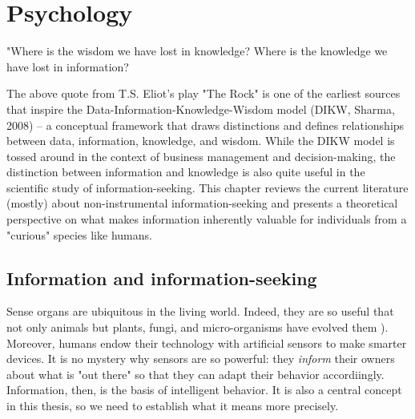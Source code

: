 \chapter{Psychology}\label{ch:psychology}

"Where is the wisdom we have lost in knowledge? Where is the knowledge we have lost in information? 

The above quote from T.S. Eliot's play "The Rock" is one of the earliest sources that inspire the Data-Information-Knowledge-Wisdom model (DIKW, Sharma, 2008) -- a conceptual framework that draws distinctions and defines relationships between data, information, knowledge, and wisdom. While the DIKW model is tossed around in the context of business management and decision-making, the distinction between information and knowledge is also quite useful in the scientific study of information-seeking. This chapter reviews the current literature (mostly) about non-instrumental information-seeking and presents a theoretical perspective on what makes information inherently valuable for individuals from a "curious" species like humans.

\section{Information and information-seeking}

Sense organs are ubiquitous in the living world. Indeed, they are so useful that not only animals but plants, fungi, and micro-organisms have evolved them \cite{trewavas_plant_2005,braunsdorf_fungal_2016,bourret_census_2006}). Moreover, humans endow their technology with artificial sensors to make smarter devices. %
It is no mystery why sensors are so powerful: they \emph{inform} their owners about what is "out there" so that they can adapt their behavior accordiingly. Information, then, is the basis of intelligent behavior. It is also a central concept in this thesis, so we need to establish what it means more precisely. 

